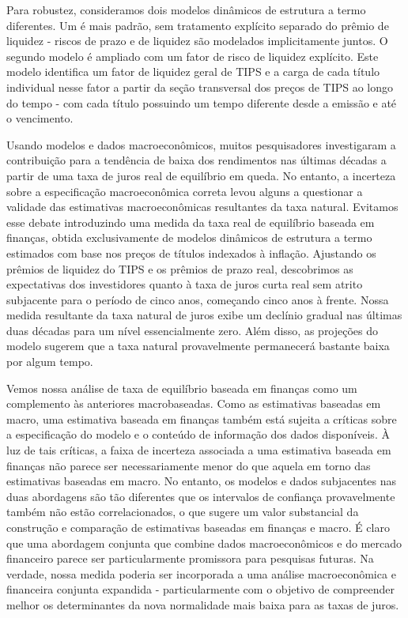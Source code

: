 Para robustez, consideramos dois modelos dinâmicos de estrutura a termo diferentes. Um é mais padrão, sem tratamento explícito separado do prêmio de liquidez - riscos de prazo e de liquidez são modelados implicitamente juntos. O segundo modelo é ampliado com um fator de risco de liquidez explícito. Este modelo identifica um fator de liquidez geral de TIPS e a carga de cada título individual nesse fator a partir da seção transversal dos preços de TIPS ao longo do tempo - com cada título possuindo um tempo diferente desde a emissão e até o vencimento.

Usando modelos e dados macroeconômicos, muitos pesquisadores investigaram a contribuição para a tendência de baixa dos rendimentos nas últimas décadas a partir de uma taxa de juros real de equilíbrio em queda. No entanto, a incerteza sobre a especificação macroeconômica correta levou alguns a questionar a validade das estimativas macroeconômicas resultantes da taxa natural. Evitamos esse debate introduzindo uma medida da taxa real de equilíbrio baseada em finanças, obtida exclusivamente de modelos dinâmicos de estrutura a termo estimados com base nos preços de títulos indexados à inflação. Ajustando os prêmios de liquidez do TIPS e os prêmios de prazo real, descobrimos as expectativas dos investidores quanto à taxa de juros curta real sem atrito subjacente para o período de cinco anos, começando cinco anos à frente. Nossa medida resultante da taxa natural de juros exibe um declínio gradual nas últimas duas décadas para um nível essencialmente zero. Além disso, as projeções do modelo sugerem que a taxa natural provavelmente permanecerá bastante baixa por algum tempo.

Vemos nossa análise de taxa de equilíbrio baseada em finanças como um complemento às anteriores macrobaseadas. Como as estimativas baseadas em macro, uma estimativa baseada em finanças também está sujeita a críticas sobre a especificação do modelo e o conteúdo de informação dos dados disponíveis. À luz de tais críticas, a faixa de incerteza associada a uma estimativa baseada em finanças não parece ser necessariamente menor do que aquela em torno das estimativas baseadas em macro. No entanto, os modelos e dados subjacentes nas duas abordagens são tão diferentes que os intervalos de confiança provavelmente também não estão correlacionados, o que sugere um valor substancial da construção e comparação de estimativas baseadas em finanças e macro. É claro que uma abordagem conjunta que combine dados macroeconômicos e do mercado financeiro parece ser particularmente promissora para pesquisas futuras. Na verdade, nossa medida poderia ser incorporada a uma análise macroeconômica e financeira conjunta expandida - particularmente com o objetivo de compreender melhor os determinantes da nova normalidade mais baixa para as taxas de juros.
%
%
